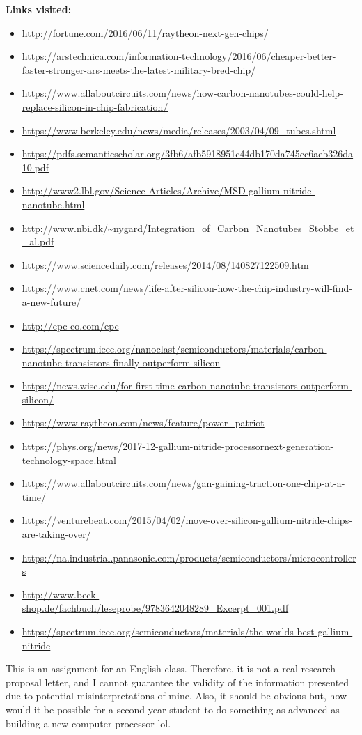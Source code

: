 \documentclass[letterpaper]{letter}
\begin{document}
\textbf{Links visited:}
\begin{itemize}
  \item \url{http://fortune.com/2016/06/11/raytheon-next-gen-chips/}
  \item \url{https://arstechnica.com/information-technology/2016/06/cheaper-better-faster-stronger-ars-meets-the-latest-military-bred-chip/}
  \item \url{https://www.allaboutcircuits.com/news/how-carbon-nanotubes-could-help-replace-silicon-in-chip-fabrication/}
  \item \url{https://www.berkeley.edu/news/media/releases/2003/04/09_tubes.shtml}
  \item \url{https://pdfs.semanticscholar.org/3fb6/afb5918951c44db170da745cc6aeb326da10.pdf}
  \item \url{http://www2.lbl.gov/Science-Articles/Archive/MSD-gallium-nitride-nanotube.html}
  \item \url{http://www.nbi.dk/~nygard/Integration_of_Carbon_Nanotubes_Stobbe_et_al.pdf}
  \item \url{https://www.sciencedaily.com/releases/2014/08/140827122509.htm}
  \item \url{https://www.cnet.com/news/life-after-silicon-how-the-chip-industry-will-find-a-new-future/}
  \item \url{http://epc-co.com/epc}
  \item \url{https://spectrum.ieee.org/nanoclast/semiconductors/materials/carbon-nanotube-transistors-finally-outperform-silicon}
  \item \url{https://news.wisc.edu/for-first-time-carbon-nanotube-transistors-outperform-silicon/}
  \item \url{https://www.raytheon.com/news/feature/power_patriot}
  \item \url{https://phys.org/news/2017-12-gallium-nitride-processornext-generation-technology-space.html}
  \item \url{https://www.allaboutcircuits.com/news/gan-gaining-traction-one-chip-at-a-time/}
  \item \url{https://venturebeat.com/2015/04/02/move-over-silicon-gallium-nitride-chips-are-taking-over/}
  \item \url{https://na.industrial.panasonic.com/products/semiconductors/microcontrollers}
  \item \url{http://www.beck-shop.de/fachbuch/leseprobe/9783642048289_Excerpt_001.pdf}
  \item \url{https://spectrum.ieee.org/semiconductors/materials/the-worlds-best-gallium-nitride}
\end{itemize}
\vspace*{\fill}
This is an assignment for an English class. Therefore, it is not a real research
proposal letter, and I cannot guarantee the validity of the information
presented due to potential misinterpretations of mine. Also, it should be
obvious but, how would it be possible for a second year student to do something
as advanced as building a new computer processor lol.
\end{document}
